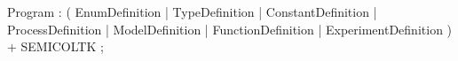 %
%
%
\begin{rail}
Program : ( EnumDefinition
          | TypeDefinition
          | ConstantDefinition
          | ProcessDefinition
          | ModelDefinition
          | FunctionDefinition
          | ExperimentDefinition
          ) + SEMICOLTK ;
\end{rail}
